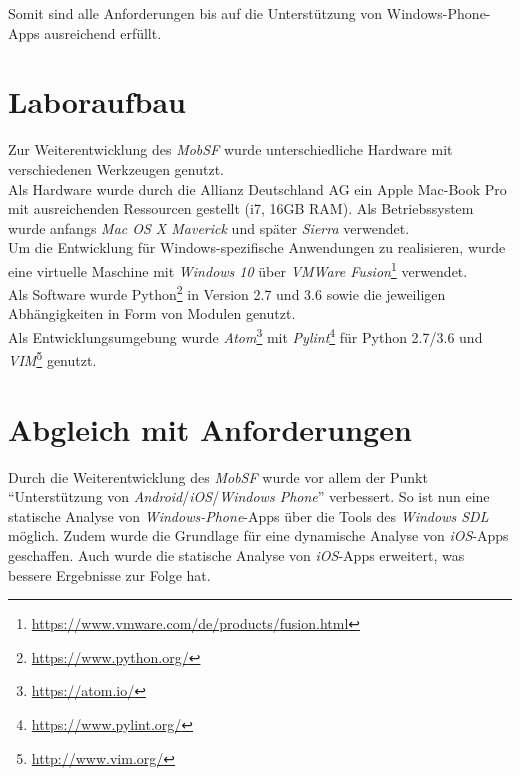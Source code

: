 Somit sind alle Anforderungen bis auf die Unterstützung von Windows-Phone-Apps ausreichend erfüllt.

\pagebreak	
\section{Laboraufbau}
Zur Weiterentwicklung des \textit{MobSF} wurde unterschiedliche Hardware mit verschiedenen Werkzeugen genutzt.\\

Als Hardware wurde durch die Allianz Deutschland AG ein Apple Mac-Book Pro mit ausreichenden Ressourcen gestellt (i7, 16GB RAM). Als Betriebssystem wurde anfangs \textit{Mac OS X Maverick} und später \textit{Sierra} verwendet.\\

Um die Entwicklung für Windows-spezifische Anwendungen zu realisieren, wurde eine virtuelle Maschine mit \textit{Windows  10} über \textit{VMWare Fusion}\footnote{\url{https://www.vmware.com/de/products/fusion.html}} verwendet.\\

Als Software wurde Python\footnote{\url{https://www.python.org/}} in Version 2.7 und 3.6 sowie die jeweiligen Abhängigkeiten in Form von Modulen genutzt.\\

Als Entwicklungsumgebung wurde \textit{Atom}\footnote{\url{https://atom.io/}} mit \textit{Pylint}\footnote{\url{https://www.pylint.org/}} für Python 2.7/3.6 und \textit{VIM}\footnote{\url{http://www.vim.org/}} genutzt.

	


		

  
\section{Abgleich mit Anforderungen}
Durch die Weiterentwicklung des \textit{MobSF} wurde vor allem der Punkt "`Unterstützung von \textit{Android}/\textit{iOS}/\textit{Windows Phone}"' verbessert. So ist nun eine statische Analyse von \textit{Windows-Phone}-Apps über die Tools des \textit{Windows SDL} möglich. Zudem wurde die Grundlage für eine dynamische Analyse von \textit{iOS}-Apps geschaffen. Auch wurde die statische Analyse von \textit{iOS}-Apps erweitert, was bessere Ergebnisse zur Folge hat.\\

